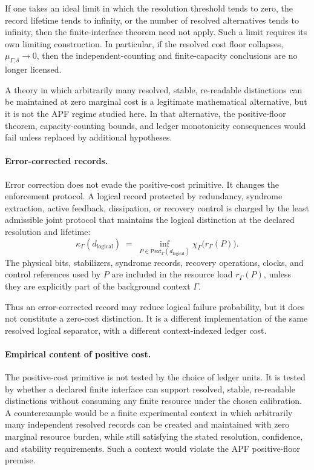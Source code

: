 \documentclass[11pt]{article}
\begin{document}
If one takes an ideal limit in which the resolution threshold tends
to zero, the record lifetime tends to infinity, or the number of
resolved alternatives tends to infinity, then the finite-interface
theorem need not apply.  Such a limit requires its own limiting
construction.  In particular, if the resolved cost floor collapses,
$\mu_{\Gamma,\delta}\to 0$, then the independent-counting and
finite-capacity conclusions are no longer licensed.

A theory in which arbitrarily many resolved, stable, re-readable
distinctions can be maintained at zero marginal cost is a legitimate
mathematical alternative, but it is not the APF regime studied here.
In that alternative, the positive-floor theorem, capacity-counting
bounds, and ledger monotonicity consequences would fail unless
replaced by additional hypotheses.

\paragraph{Error-corrected records.}
Error correction does not evade the positive-cost primitive.  It
changes the enforcement protocol.  A logical record protected by
redundancy, syndrome extraction, active feedback, dissipation, or
recovery control is charged by the least admissible joint protocol
that maintains the logical distinction at the declared resolution and
lifetime:
\[
    \kappa_\Gamma(d_{\mathrm{logical}})
    \;=\;
    \inf_{P\in\mathsf{Prot}_\Gamma(d_{\mathrm{logical}})}
    \chi_\Gamma\bigl(r_\Gamma(P)\bigr).
\]
The physical bits, stabilizers, syndrome records, recovery
operations, clocks, and control references used by $P$ are included
in the resource load $r_\Gamma(P)$, unless they are explicitly part
of the background context $\Gamma$.

Thus an error-corrected record may reduce logical failure
probability, but it does not constitute a zero-cost distinction.  It
is a different implementation of the same resolved logical
separator, with a different context-indexed ledger cost.

\paragraph{Empirical content of positive cost.}
The positive-cost primitive is not tested by the choice of ledger
units.  It is tested by whether a declared finite interface can
support resolved, stable, re-readable distinctions without consuming
any finite resource under the chosen calibration.  A counterexample
would be a finite experimental context in which arbitrarily many
independent resolved records can be created and maintained with
zero marginal resource burden, while still satisfying the stated
resolution, confidence, and stability requirements.  Such a context
would violate the APF positive-floor premise.
\end{document}
